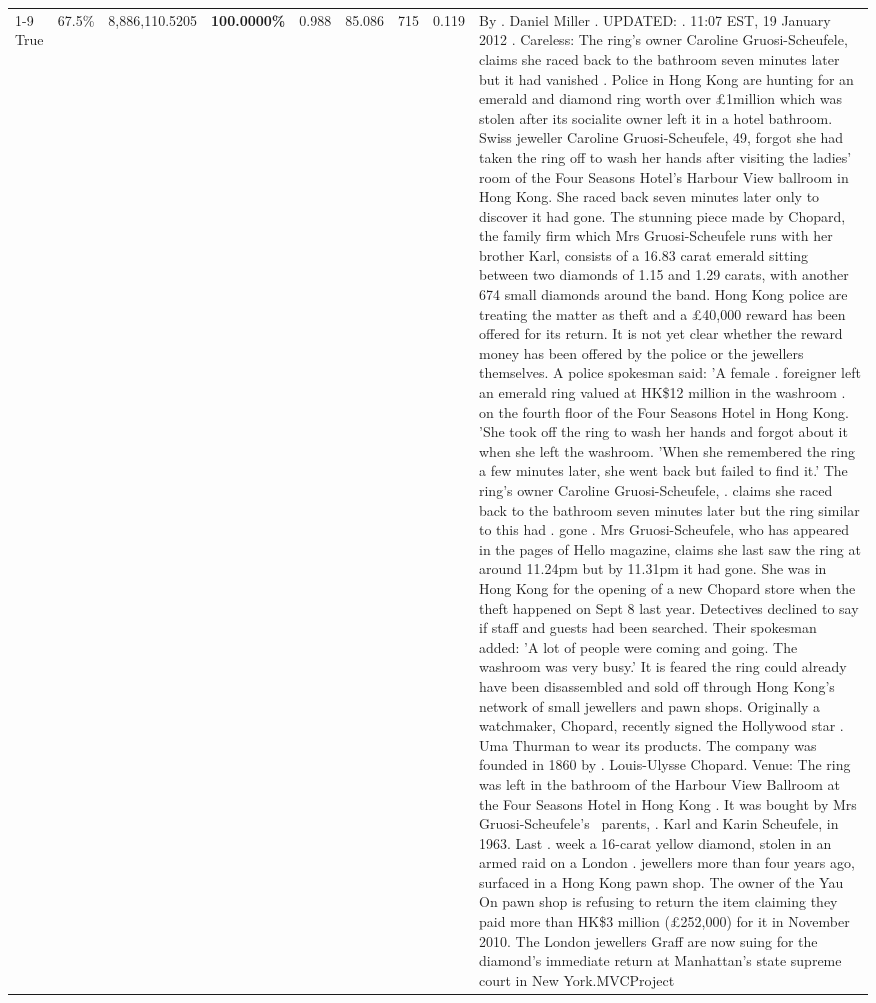 \begin{table}[H]
\begin{tabular}{lllrlllll}
\cline{1-9} \cline{2-9}
True & 67.5\% & 8,886,110.5205 & \bfseries \color{red} 100.0000\% & 0.988 & 85.086 & 715 & 0.119 & By . Daniel Miller . UPDATED: . 11:07 EST, 19 January 2012 . Careless: The ring's owner Caroline Gruosi-Scheufele, claims she raced back to the bathroom seven minutes later but it had vanished . Police in Hong Kong are hunting for an emerald and diamond ring worth over £1million which was stolen after its socialite owner left it in a hotel bathroom. Swiss jeweller Caroline Gruosi-Scheufele, 49, forgot she had taken the ring off to wash her hands after visiting the ladies' room of the Four Seasons Hotel's Harbour View ballroom in Hong Kong. She raced back seven minutes later only to discover it had gone. The stunning piece made by Chopard, the family firm which Mrs Gruosi-Scheufele runs with her brother Karl, consists of a 16.83 carat emerald sitting between two diamonds of 1.15 and 1.29 carats, with another 674 small diamonds around the band. Hong Kong police are treating the matter as theft and a £40,000 reward has been offered for its return. It is not yet clear whether the reward money has been offered by the police or the jewellers themselves. A police spokesman said: 'A female . foreigner left an emerald ring valued at HK\$12 million in the washroom . on the fourth floor of the Four Seasons Hotel in Hong Kong. 'She took off the ring to wash her hands and forgot about it when she left the washroom. 'When she remembered the ring a few minutes later, she went back but failed to find it.' The ring's owner Caroline Gruosi-Scheufele, . claims she raced back to the bathroom seven minutes later but the ring similar to this had . gone . Mrs Gruosi-Scheufele, who has appeared in the pages of Hello magazine, claims she last saw the ring at around 11.24pm but by 11.31pm it had gone. She was in Hong Kong for the opening of a new Chopard store when the theft happened on Sept 8 last year. Detectives declined to say if staff and guests had been searched. Their spokesman added: 'A lot of people were coming and going. The washroom was very busy.' It is feared the ring could already have been disassembled and sold off through Hong Kong's network of small jewellers and pawn shops. Originally a watchmaker, Chopard, recently signed the Hollywood star . Uma Thurman to wear its products. The company was founded in 1860 by . Louis-Ulysse Chopard. Venue: The ring was left in the bathroom of the Harbour View Ballroom at the Four Seasons Hotel in Hong Kong . It was bought by Mrs Gruosi-Scheufele's  parents, . Karl and Karin Scheufele, in 1963. Last . week a 16-carat yellow diamond, stolen in an armed raid on a London . jewellers more than four years ago, surfaced in a Hong Kong pawn shop. The owner of the Yau On pawn shop is refusing to return the item claiming they paid more than HK\$3 million (£252,000) for it in November 2010. The London jewellers Graff are now suing for the diamond’s immediate return at Manhattan’s state supreme court in New York.MVCProject \\

\end{tabular}
\end{table}
